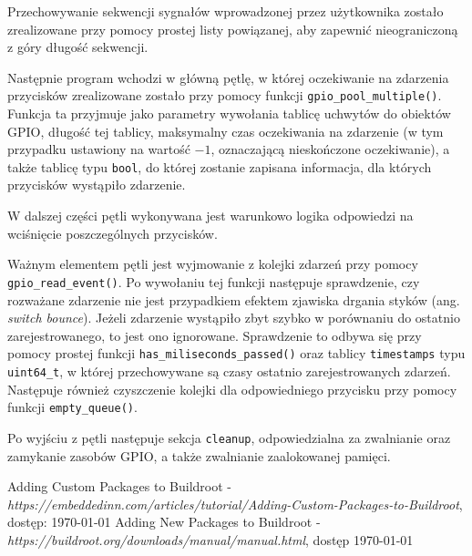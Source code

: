 \documentclass{article}
\begin{document}
Przechowywanie sekwencji sygnałów wprowadzonej przez użytkownika zostało zrealizowane przy pomocy prostej listy powiązanej, aby zapewnić nieograniczoną z góry długość sekwencji.

Następnie program wchodzi w główną pętlę, w której oczekiwanie na zdarzenia przycisków zrealizowane zostało przy pomocy funkcji \texttt{gpio\_pool\_multiple()}. Funkcja ta przyjmuje jako parametry wywołania tablicę uchwytów do obiektów GPIO, długość tej tablicy, maksymalny czas oczekiwania na zdarzenie (w tym przypadku ustawiony na wartość $-1$, oznaczającą nieskończone oczekiwanie), a także tablicę typu \texttt{bool}, do której zostanie zapisana informacja, dla których przycisków wystąpiło zdarzenie.

W dalszej części pętli wykonywana jest warunkowo logika odpowiedzi na wciśnięcie poszczególnych przycisków. 

Ważnym elementem pętli jest wyjmowanie z kolejki zdarzeń przy pomocy \texttt{gpio\_read\_event()}. Po wywołaniu tej funkcji następuje sprawdzenie, czy rozważane zdarzenie nie jest przypadkiem efektem zjawiska drgania styków (ang. \textit{switch bounce}). Jeżeli zdarzenie wystąpiło zbyt szybko w porównaniu do ostatnio zarejestrowanego, to jest ono ignorowane. Sprawdzenie to odbywa się przy pomocy prostej funkcji \texttt{has\_miliseconds\_passed()} oraz tablicy \texttt{timestamps} typu \texttt{uint64\_t}, w której przechowywane są czasy ostatnio zarejestrowanych zdarzeń. Następuje również czyszczenie kolejki dla odpowiedniego przycisku przy pomocy funkcji \texttt{empty\_queue()}.

Po wyjściu z pętli następuje sekcja \texttt{cleanup}, odpowiedzialna za zwalnianie oraz zamykanie zasobów GPIO, a także zwalnianie zaalokowanej pamięci.


\begin{thebibliography}{9}
 Adding Custom Packages to Buildroot - \textit{https://embeddedinn.com/articles/tutorial/Adding-Custom-Packages-to-Buildroot}, dostęp: \today
{} Adding New Packages to Buildroot - \textit{https://buildroot.org/downloads/manual/manual.html}, dostęp \today
\end{thebibliography}
\end{document}
